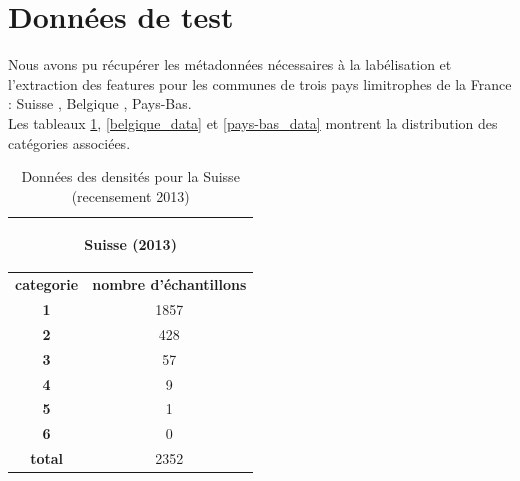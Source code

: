 \documentclass{book}
\begin{document}
\section{Données de test}

Nous avons pu récupérer les métadonnées nécessaires à la labélisation et l'extraction des features pour les communes de trois pays limitrophes de la France : Suisse \cite{suisse}, Belgique \cite{belgique}, Pays-Bas\cite{pays-bas}.\\
Les tableaux \ref{suisse_data}, \ref{belgique_data} et \ref{pays-bas_data} montrent la distribution des catégories associées.

   \begin{table}[H]
   \begin{center}
   \begin{adjustbox}{max width=0.5\textwidth}
    \begin{tabular}{|c|c|}
      \hline
      \multicolumn{2}{|c|}{\begin{bf}Suisse (2013)\end{bf}} \\
      \hline
      \textbf{categorie} & \textbf{nombre d'échantillons}\\
      \hline
      \textbf{1} & 1857\\
      \hline
      \textbf{2} & 428\\
      \hline
      \textbf{3} & 57\\
      \hline
      \textbf{4} & 9\\
      \hline
      \textbf{5} & 1\\
      \hline
      \textbf{6} & 0 \\
      \hline
      \textbf{total} & 2352\\
      \hline
    \end{tabular}
   \end{adjustbox}
   \caption{Données des densités pour la Suisse (recensement 2013)}
   \label{suisse_data}
   \end{center}
   \end{table}
\end{document}
